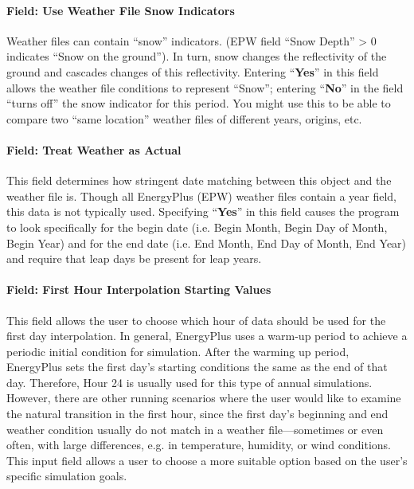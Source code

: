 \paragraph{Field: Use Weather File Snow Indicators}\label{field-use-weather-file-snow-indicators-1}

Weather files can contain ``snow'' indicators. (EPW field ``Snow Depth'' \textgreater{} 0 indicates
``Snow on the ground''). In turn, snow changes the reflectivity of the ground and cascades changes of this
reflectivity. Entering ``\textbf{Yes}'' in this field allows the weather file conditions to represent
``Snow''; entering ``\textbf{No}'' in the field ``turns off'' the snow indicator for this period. You might
use this to be able to compare two ``same location'' weather files of different years, origins, etc.

\paragraph{Field: Treat Weather as Actual}\label{field-treat-weather-as-actual}

This field determines how stringent date matching between this object and the weather file is. Though all
EnergyPlus (EPW) weather files contain a year field, this data is not typically used. Specifying
``\textbf{Yes}'' in this field causes the program to look specifically for the begin date (i.e. Begin Month,
Begin Day of Month, Begin Year) and for the end date (i.e. End Month, End Day of Month, End Year) and require
that leap days be present for leap years.

\paragraph{Field: First Hour Interpolation Starting Values}\label{field-first-hour-interpolation-starting-values}

This field allows the user to choose which hour of data should be used for the first day interpolation. In general, EnergyPlus uses a warm-up period to achieve a periodic initial condition for simulation. After the warming up period, EnergyPlus sets the first day's starting conditions the same as the end of that day. Therefore, Hour 24 is usually used for this type of annual simulations. However, there are other running scenarios where the user would like to examine the natural transition in the first hour, since the first day's beginning and end weather condition usually do not match in a weather file---sometimes or even often, with large differences, e.g. in temperature, humidity, or wind conditions. This input field allows a user to choose a more suitable option based on the user's specific simulation goals.

